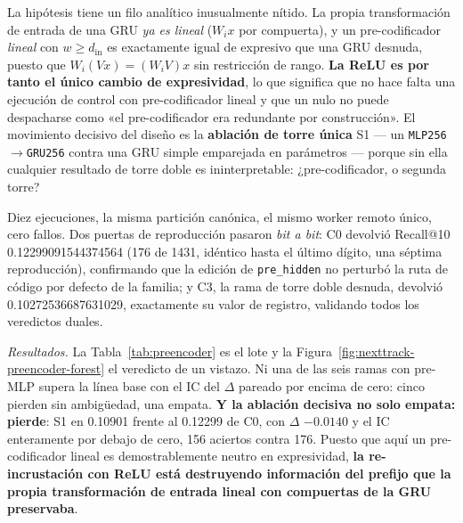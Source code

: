\documentclass[11pt]{article}
\begin{document}
La hipótesis tiene un filo analítico inusualmente nítido. La propia
transformación de entrada de una GRU \emph{ya es lineal} ($W_i x$ por compuerta),
y un pre-codificador \emph{lineal} con $w \ge d_{\text{in}}$ es exactamente igual
de expresivo que una GRU desnuda, puesto que $W_i(Vx) = (W_iV)x$ sin restricción
de rango. \textbf{La ReLU es por tanto el único cambio de expresividad}, lo que
significa que no hace falta una ejecución de control con pre-codificador lineal y
que un nulo no puede despacharse como «el pre-codificador era redundante por
construcción». El movimiento decisivo del diseño es la \textbf{ablación de torre
única} S1 --- un \texttt{MLP256}$\to$\texttt{GRU256} contra una GRU simple
emparejada en parámetros --- porque sin ella cualquier resultado de torre doble
es ininterpretable: ¿pre-codificador, o segunda torre?

Diez ejecuciones, la misma partición canónica, el mismo worker remoto único, cero
fallos. Dos puertas de reproducción pasaron \emph{bit a bit}: C0 devolvió
Recall@10 \num{0.12299091544374564} (\num{176} de \num{1431}, idéntico hasta el
último dígito, una séptima reproducción), confirmando que la edición de
\texttt{pre\_hidden} no perturbó la ruta de código por defecto de la familia; y
C3, la rama de torre doble desnuda, devolvió \num{0.10272536687631029},
exactamente su valor de registro, validando todos los veredictos duales.

\emph{Resultados.} La Tabla~\ref{tab:preencoder} es el lote y la
Figura~\ref{fig:nexttrack-preencoder-forest} el veredicto de un vistazo. Ni una
de las seis ramas con pre-MLP supera la línea base con el IC del $\Delta$ pareado
por encima de cero: cinco pierden sin ambigüedad, una empata. \textbf{Y la
ablación decisiva no solo empata: pierde}: S1 en \num{0.10901} frente al
\num{0.12299} de C0, con $\Delta$ $-\num{0.0140}$ y el IC enteramente por debajo
de cero, \num{156} aciertos contra \num{176}. Puesto que aquí un
pre-codificador lineal es demostrablemente neutro en expresividad, \textbf{la
re-incrustación con ReLU está destruyendo información del prefijo que la propia
transformación de entrada lineal con compuertas de la GRU preservaba}.
\end{document}
